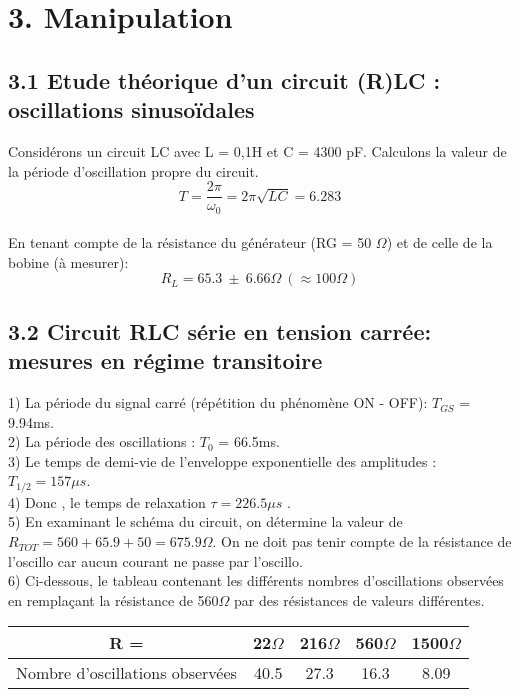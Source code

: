 \documentclass{report}
\begin{document}
\section*{3. Manipulation}
\subsection*{3.1 Etude théorique d'un circuit (R)LC : oscillations sinusoïdales}
Considérons un circuit  LC  avec  L  =  0,1H  et  C  =  4300 pF.
Calculons la valeur de la période d’oscillation propre du circuit. \\

$$ T =  \frac{2 \pi}{\omega_{0}} = 2 \pi \sqrt{LC} = 6.283 $$ \\

En tenant compte  de la  résistance  du  générateur (RG =  50 $\Omega$) et  de  celle de  la  bobine  (à mesurer): \\
$$ R_{L} = 65.3 \ \pm \ 6.66 \Omega \ (\approx 100 \Omega) $$

\subsection*{3.2 Circuit RLC série en tension carrée: mesures en régime transitoire}
1) La période du signal carré (répétition du phénomène ON - OFF): $T_{GS}$ = 9.94ms. \\
2) La période des oscillations : $T_{0}$ = 66.5ms.\\
3) Le temps de demi-vie de l'enveloppe exponentielle des amplitudes : $T_{1/2} = 157 \mu s$. \\
4) Donc , le temps de relaxation $\tau = 226.5 \mu s$ . \\
5) En examinant le schéma  du circuit, on détermine la valeur de $R_{TOT} = 560 + 65.9 + 50 = 675.9 \Omega$. On ne doit pas tenir compte de la résistance de l'oscillo car aucun courant ne passe par l'oscillo. \\
6) Ci-dessous, le tableau contenant les différents nombres d'oscillations observées en remplaçant la résistance de 560$\Omega$ par des résistances de valeurs différentes. \\

\begin{tabular}{|c|c|c|c|c|}
  \hline
  R = & 22$\Omega$ & 216$\Omega$ & 560$\Omega$  & 1500$\Omega$ \\
  \hline
  Nombre d'oscillations observées & 40.5 & 27.3 & 16.3 & 8.09 \\
  \hline
\end{tabular}
\end{document}
